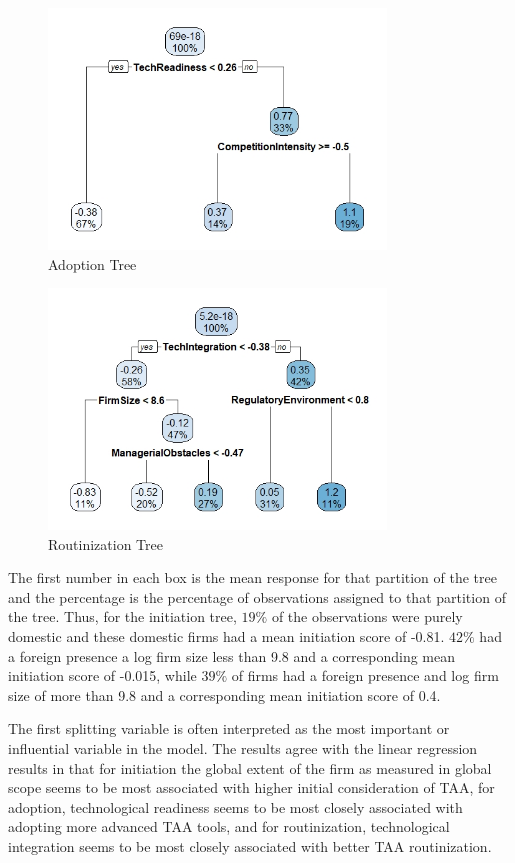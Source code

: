 \documentclass[12pt]{article}
\begin{document}
\begin{figure}[H]
\centering
\includegraphics[width=0.8\textwidth]{adopt_tree.jpeg}
\caption{Adoption Tree}
\label{fig:adopt_tree}
\end{figure}

\begin{figure}[H]
\centering
\includegraphics[width=0.8\textwidth]{rout_tree.jpeg}
\caption{Routinization Tree}
\label{fig:rout_tree}
\end{figure}

The first number in each box is the mean response for that partition of the tree and the percentage is the percentage of observations assigned to that partition of the tree. Thus, for the initiation tree, $19\%$ of the observations were purely domestic and these domestic firms had a mean initiation score of -0.81. $42\%$ had a foreign presence a log firm size less than 9.8 and a corresponding mean initiation score of -0.015, while $39\%$ of firms had a foreign presence and log firm size of more than 9.8 and a corresponding mean initiation score of 0.4.    

The first splitting variable is often interpreted as the most important or influential variable in the model. The results agree with the linear regression results in that for initiation the global extent of the firm as measured in global scope seems to be most associated with higher initial consideration of TAA, for adoption, technological readiness seems to be most closely associated with adopting more advanced TAA tools, and for routinization, technological integration seems to be most closely associated with better TAA routinization. \\
\end{document}
